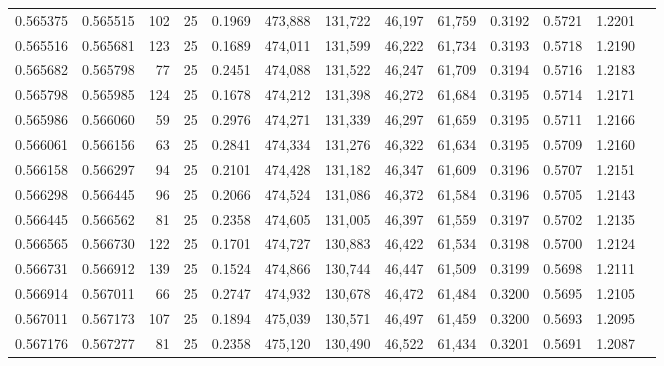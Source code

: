 \begin{tabular}{rrrrrrrrrrrrr}
0.565375 & 0.565515 &   102 &  25 &                                     0.1969 & 473,888 & 131,722 &  46,197 &  61,759 & 0.3192 & 0.5721 & 1.2201 \\
0.565516 & 0.565681 &   123 &  25 &                                     0.1689 & 474,011 & 131,599 &  46,222 &  61,734 & 0.3193 & 0.5718 & 1.2190 \\
0.565682 & 0.565798 &    77 &  25 &                                     0.2451 & 474,088 & 131,522 &  46,247 &  61,709 & 0.3194 & 0.5716 & 1.2183 \\
0.565798 & 0.565985 &   124 &  25 &                                     0.1678 & 474,212 & 131,398 &  46,272 &  61,684 & 0.3195 & 0.5714 & 1.2171 \\
0.565986 & 0.566060 &    59 &  25 &                                     0.2976 & 474,271 & 131,339 &  46,297 &  61,659 & 0.3195 & 0.5711 & 1.2166 \\
0.566061 & 0.566156 &    63 &  25 &                                     0.2841 & 474,334 & 131,276 &  46,322 &  61,634 & 0.3195 & 0.5709 & 1.2160 \\
0.566158 & 0.566297 &    94 &  25 &                                     0.2101 & 474,428 & 131,182 &  46,347 &  61,609 & 0.3196 & 0.5707 & 1.2151 \\
0.566298 & 0.566445 &    96 &  25 &                                     0.2066 & 474,524 & 131,086 &  46,372 &  61,584 & 0.3196 & 0.5705 & 1.2143 \\
0.566445 & 0.566562 &    81 &  25 &                                     0.2358 & 474,605 & 131,005 &  46,397 &  61,559 & 0.3197 & 0.5702 & 1.2135 \\
0.566565 & 0.566730 &   122 &  25 &                                     0.1701 & 474,727 & 130,883 &  46,422 &  61,534 & 0.3198 & 0.5700 & 1.2124 \\
0.566731 & 0.566912 &   139 &  25 &                                     0.1524 & 474,866 & 130,744 &  46,447 &  61,509 & 0.3199 & 0.5698 & 1.2111 \\
0.566914 & 0.567011 &    66 &  25 &                                     0.2747 & 474,932 & 130,678 &  46,472 &  61,484 & 0.3200 & 0.5695 & 1.2105 \\
0.567011 & 0.567173 &   107 &  25 &                                     0.1894 & 475,039 & 130,571 &  46,497 &  61,459 & 0.3200 & 0.5693 & 1.2095 \\
0.567176 & 0.567277 &    81 &  25 &                                     0.2358 & 475,120 & 130,490 &  46,522 &  61,434 & 0.3201 & 0.5691 & 1.2087 \\

\end{tabular}
